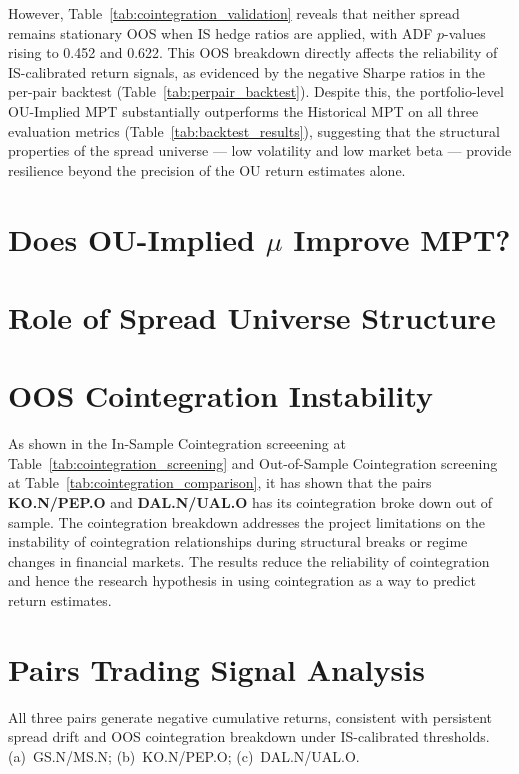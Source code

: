 \documentclass[a4paper]{report}
\begin{document}
However, Table~\ref{tab:cointegration_validation} reveals that neither spread
remains stationary OOS when IS hedge ratios are applied, with ADF $p$-values rising
to 0.452 and 0.622. This OOS breakdown directly affects the reliability of IS-calibrated
return signals, as evidenced by the negative Sharpe ratios in the per-pair backtest
(Table~\ref{tab:perpair_backtest}). Despite this, the portfolio-level OU-Implied MPT
substantially outperforms the Historical MPT on all three evaluation metrics
(Table~\ref{tab:backtest_results}), suggesting that the structural properties of
the spread universe — low volatility and low market beta — provide resilience
beyond the precision of the OU return estimates alone.

\section{Does OU-Implied $\mu$ Improve MPT?}


\section{Role of Spread Universe Structure}

\section{OOS Cointegration Instability}

As shown in the In-Sample Cointegration screeening at Table~\ref{tab:cointegration_screening} and Out-of-Sample Cointegration screening at Table~\ref{tab:cointegration_comparison}, it has shown that the pairs \textbf{KO.N/PEP.O} and \textbf{DAL.N/UAL.O} has its cointegration broke down out of sample. The cointegration breakdown addresses the project limitations on the instability of cointegration relationships during structural breaks or regime changes in financial markets. The results reduce the reliability of cointegration and hence the research hypothesis in using cointegration as a way to predict return estimates.


\section{Pairs Trading Signal Analysis}

All three pairs generate negative cumulative returns, consistent with persistent
spread drift and OOS cointegration breakdown under IS-calibrated thresholds.
(a)~GS.N/MS.N; (b)~KO.N/PEP.O; (c)~DAL.N/UAL.O.
\end{document}
